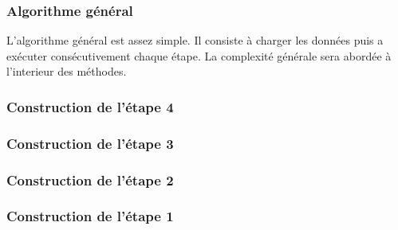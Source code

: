 \documentclass[letterpaper,12pt]{article}
\begin{document}
\subsubsection{Algorithme général}
L'algorithme général est assez simple. Il consiste à charger les données puis a exécuter consécutivement chaque étape. La complexité générale sera abordée à l'interieur des méthodes.
\subsubsection{Construction de l'étape 4}
\subsubsection{Construction de l'étape 3}
\subsubsection{Construction de l'étape 2}
\subsubsection{Construction de l'étape 1}
\end{document}
